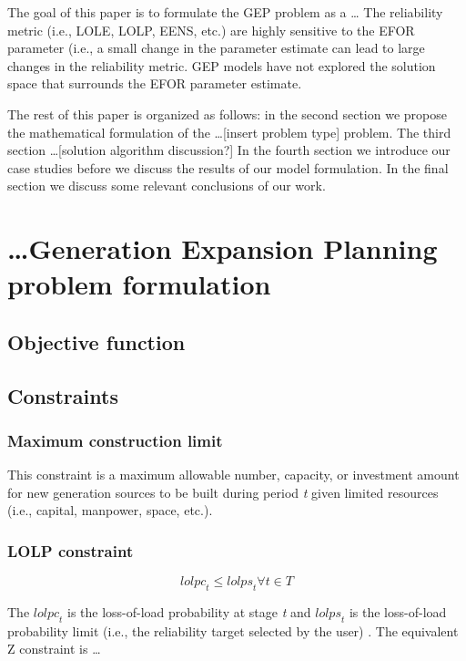 \documentclass[10pt]{amsart}
\begin{document}
The goal of this paper is to formulate the GEP problem as a \ldots
The reliability metric (i.e., LOLE, LOLP, EENS, etc.) are highly sensitive to the EFOR parameter (i.e., a small change in the parameter estimate can lead to large changes in the reliability metric. 
GEP models have not explored the solution space that surrounds the EFOR parameter estimate. 

The rest of this paper is organized as follows: in the second section we propose the mathematical formulation of the \ldots [insert problem type] problem. 
The third section \ldots [solution algorithm discussion?]
In the fourth section we introduce our case studies before we discuss the results of our model formulation.
In the final section we discuss some relevant conclusions of our work. 

\section{\ldots Generation Expansion Planning problem formulation}
\subsection{Objective function \nopunct}

\subsection{Constraints \nopunct}
\subsubsection{Maximum construction limit \nopunct}
This constraint is a maximum allowable number, capacity, or investment amount for new generation sources to be built during period \textit{t} given limited resources (i.e., capital, manpower, space, etc.). 
\subsubsection{LOLP constraint \nopunct}
\begin{equation}
\textit{lolpc}_{t} \leq \textit{lolps}_{t} \forall t \in T 
\end{equation}

The $\textit{lolpc}_{t}$ is the loss-of-load probability at stage \textit{t} and $\textit{lolps}_{t}$ is the loss-of-load probability limit (i.e., the reliability target selected by the user) \parencite{dragoon:2006aa}. 
The equivalent Z constraint is \ldots
\end{document}

